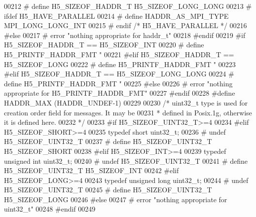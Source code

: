 \begin{DoxyCode}
00212 \textcolor{preprocessor}{#   define H5\_SIZEOF\_HADDR\_T        H5\_SIZEOF\_LONG\_LONG}
00213 \textcolor{preprocessor}{#   ifdef H5\_HAVE\_PARALLEL}
00214 \textcolor{preprocessor}{#       define HADDR\_AS\_MPI\_TYPE    MPI\_LONG\_LONG\_INT}
00215 \textcolor{preprocessor}{#   endif  }\textcolor{comment}{/* H5\_HAVE\_PARALLEL */}\textcolor{preprocessor}{}
00216 \textcolor{preprocessor}{#else}
00217 \textcolor{preprocessor}{#   error "nothing appropriate for haddr\_t"}
00218 \textcolor{preprocessor}{#endif}
00219 \textcolor{preprocessor}{#if H5\_SIZEOF\_HADDR\_T == H5\_SIZEOF\_INT}
00220 \textcolor{preprocessor}{#   define H5\_PRINTF\_HADDR\_FMT  "%
00221 \textcolor{preprocessor}{#elif H5\_SIZEOF\_HADDR\_T == H5\_SIZEOF\_LONG}
00222 \textcolor{preprocessor}{#   define H5\_PRINTF\_HADDR\_FMT  "%
00223 \textcolor{preprocessor}{#elif H5\_SIZEOF\_HADDR\_T == H5\_SIZEOF\_LONG\_LONG}
00224 \textcolor{preprocessor}{#   define H5\_PRINTF\_HADDR\_FMT  "%
00225 \textcolor{preprocessor}{#else}
00226 \textcolor{preprocessor}{#   error "nothing appropriate for H5\_PRINTF\_HADDR\_FMT"}
00227 \textcolor{preprocessor}{#endif}
00228 \textcolor{preprocessor}{#define HADDR\_MAX       (HADDR\_UNDEF-1)}
00229 
00230 \textcolor{comment}{/* uint32\_t type is used for creation order field for messages.  It may be}
00231 \textcolor{comment}{ * defined in Posix.1g, otherwise it is defined here.}
00232 \textcolor{comment}{ */}
00233 \textcolor{preprocessor}{#if H5\_SIZEOF\_UINT32\_T>=4}
00234 \textcolor{preprocessor}{#elif H5\_SIZEOF\_SHORT>=4}
00235     \textcolor{keyword}{typedef} \textcolor{keywordtype}{short} uint32\_t;
00236 \textcolor{preprocessor}{#   undef H5\_SIZEOF\_UINT32\_T}
00237 \textcolor{preprocessor}{#   define H5\_SIZEOF\_UINT32\_T H5\_SIZEOF\_SHORT}
00238 \textcolor{preprocessor}{#elif H5\_SIZEOF\_INT>=4}
00239     \textcolor{keyword}{typedef} \textcolor{keywordtype}{unsigned} \textcolor{keywordtype}{int} uint32\_t;
00240 \textcolor{preprocessor}{#   undef H5\_SIZEOF\_UINT32\_T}
00241 \textcolor{preprocessor}{#   define H5\_SIZEOF\_UINT32\_T H5\_SIZEOF\_INT}
00242 \textcolor{preprocessor}{#elif H5\_SIZEOF\_LONG>=4}
00243     \textcolor{keyword}{typedef} \textcolor{keywordtype}{unsigned} \textcolor{keywordtype}{long} uint32\_t;
00244 \textcolor{preprocessor}{#   undef H5\_SIZEOF\_UINT32\_T}
00245 \textcolor{preprocessor}{#   define H5\_SIZEOF\_UINT32\_T H5\_SIZEOF\_LONG}
00246 \textcolor{preprocessor}{#else}
00247 \textcolor{preprocessor}{#   error "nothing appropriate for uint32\_t"}
00248 \textcolor{preprocessor}{#endif}
00249 
}}}
\end{DoxyCode}
